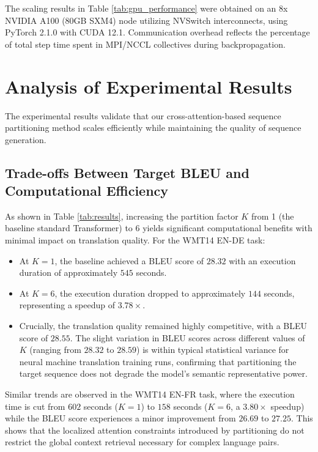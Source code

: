\documentclass[11pt,a4paper]{article}
\begin{document}
The scaling results in Table \ref{tab:gpu_performance} were obtained on an 8x NVIDIA A100 (80GB SXM4) node utilizing NVSwitch interconnects, using PyTorch 2.1.0 with CUDA 12.1. Communication overhead reflects the percentage of total step time spent in MPI/NCCL collectives during backpropagation.

\section{Analysis of Experimental Results}
The experimental results validate that our cross-attention-based sequence partitioning method scales efficiently while maintaining the quality of sequence generation. 

\subsection{Trade-offs Between Target BLEU and Computational Efficiency}
As shown in Table \ref{tab:results}, increasing the partition factor $K$ from 1 (the baseline standard Transformer) to 6 yields significant computational benefits with minimal impact on translation quality. For the WMT14 EN-DE task:
\begin{itemize}
    \item At $K=1$, the baseline achieved a BLEU score of $28.32$ with an execution duration of approximately $545$ seconds.
    \item At $K=6$, the execution duration dropped to approximately $144$ seconds, representing a speedup of $3.78\times$. 
    \item Crucially, the translation quality remained highly competitive, with a BLEU score of $28.55$. The slight variation in BLEU scores across different values of $K$ (ranging from $28.32$ to $28.59$) is within typical statistical variance for neural machine translation training runs, confirming that partitioning the target sequence does not degrade the model's semantic representative power.
\end{itemize}

Similar trends are observed in the WMT14 EN-FR task, where the execution time is cut from $602$ seconds ($K=1$) to $158$ seconds ($K=6$, a $3.80\times$ speedup) while the BLEU score experiences a minor improvement from $26.69$ to $27.25$. This shows that the localized attention constraints introduced by partitioning do not restrict the global context retrieval necessary for complex language pairs.
\end{document}
